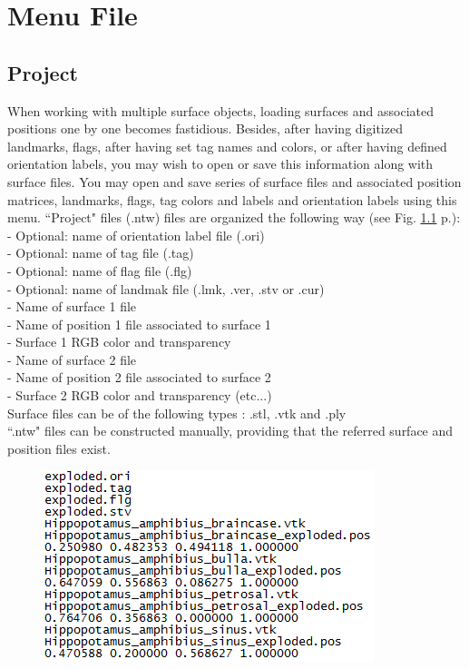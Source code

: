 \chapter{Menu File}
\minitoc  


\section{Project}
When working with multiple surface objects, loading surfaces and associated positions one by one becomes fastidious. Besides, after having digitized landmarks, flags, after having set tag names and colors, or after having defined orientation labels, you may wish to open or save this information along with surface files. You may open and save series of surface files and associated position matrices, landmarks, flags, tag colors and labels and orientation labels using this menu. ``Project" files (.ntw) files are organized the following way (see Fig. \ref{project_file} p.\pageref{project_file}):\\
- Optional: name of orientation label file (.ori)\\
- Optional: name of tag file (.tag)\\
- Optional: name of flag file (.flg)\\
- Optional: name of landmak file (.lmk, .ver, .stv or .cur)\\
- Name of surface 1 file\\
- Name of position 1 file associated to surface 1\\
- Surface 1 RGB color and transparency\\
- Name of surface 2 file\\
- Name of position 2 file associated to surface 2\\
- Surface 2 RGB color and transparency (etc...)\\
 
Surface files can be of the following types : .stl, .vtk and .ply\\
``.ntw" files can be constructed manually, providing that the referred surface and position files exist.



\begin{figure}
  \centering  
 \includegraphics[scale=0.5]{images/07/project/ntw.png}
\label{project_file}
\end{figure}

